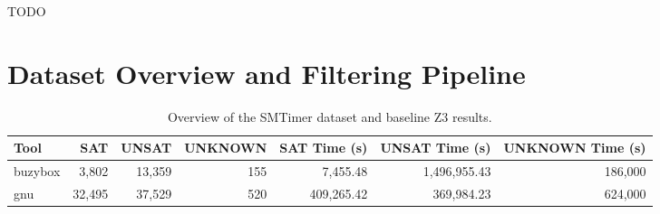 \documentclass[acmsmall,screen,review,anonymous]{acmart}
\begin{document}

\maketitle











\begin{acks}
	TODO
\end{acks}




\appendix
 
\section{Dataset Overview and Filtering Pipeline}
\label{sec:appendix-dataset}

\begin{table}[h]
  \centering
  \caption{Overview of the SMTimer dataset and baseline Z3 results.}
  \label{dataset}
  \begin{tabular}{lrrrrrr}
    \toprule
    Tool & SAT & UNSAT & UNKNOWN & SAT Time (s) & UNSAT Time (s) & UNKNOWN Time (s) \\
    \midrule
    buzybox & 3{,}802 & 13{,}359 & 155 & 7{,}455.48 & 1{,}496{,}955.43 & 186{,}000 \\
    gnu & 32{,}495 & 37{,}529 & 520 & 409{,}265.42 & 369{,}984.23 & 624{,}000 \\
    \bottomrule
  \end{tabular}
\end{table}
\end{document}
